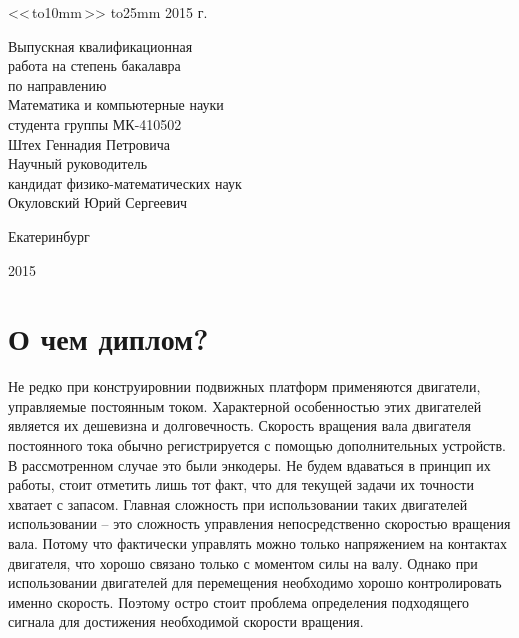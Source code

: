 \documentclass[14pt]{extreport}
\begin{document}
\begin{titlepage}
{\begin{parbox}[t]{9cm}
{                <<\,\hbox to10mm{\hrulefill}\,>>  \hbox to25mm{\hrulefill}  2015 г.
            }
            \end{parbox}
            \begin{parbox}[t]{9cm}{\small  {}
                Выпускная квалификационная \\
                работа на степень бакалавра\\
                 по направлению\\
                Математика и компьютерные науки\\
                студента группы МК-410502 \\
                                \bigskip
                Штех Геннадия Петровича\\
                Научный руководитель\\
                кандидат физико-математических наук \\
                Окуловский Юрий Сергеевич\\
            }
            \end{parbox}
        \vfill
        \centerline{Екатеринбург}
        \centerline{2015}
        }\restoregeometry
    \end{titlepage}
\newpage
    \tableofcontents

\newpage
    \chapter{О чем диплом?}
        Не редко при конструировнии подвижных платформ применяются двигатели, управляемые постоянным током. Характерной особенностью этих двигателей является их дешевизна и долговечность. Скорость вращения вала двигателя постоянного тока обычно регистрируется с помощью дополнительных устройств. В рассмотренном случае это были энкодеры. Не будем вдаваться в принцип их работы, стоит отметить лишь тот факт, что для текущей задачи их точности хватает с запасом. Главная сложность при использовании таких двигателей использовании -- это сложность управления непосредственно скоростью вращения вала. Потому что фактически управлять можно только напряжением на контактах двигателя, что хорошо связано только с моментом силы на валу. Однако при использовании двигателей для перемещения необходимо хорошо контролировать именно скорость. Поэтому остро стоит проблема определения подходящего сигнала для достижения необходимой скорости вращения.
\end{document}
